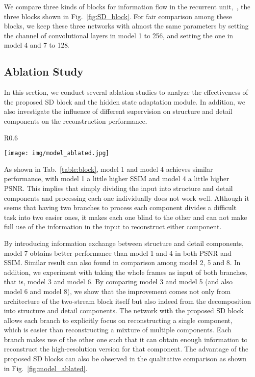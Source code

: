 {}
We compare three kinds of blocks for information flow in the recurrent unit,~\ie, the three blocks shown in Fig.~\ref{fig:SD_block}. 
For fair comparison among these blocks, we keep these three networks with almost the same parameters by setting the channel of convolutional layers in model 1 to 256, and setting the one in model 4 and 7 to 128.
\subsection{Ablation Study}
In this section, we conduct several ablation studies to analyze the effectiveness of the proposed SD block and the hidden state adaptation module. In addition, we also investigate the influence of different supervision on structure and detail components on the reconstruction performance.
\begin{wrapfigure}{R}{0.6\textwidth}
  \vspace{-30pt}
  \begin{center}
    \texttt{[image: img/model\_ablated.jpg]}	
  \end{center}  
  \vspace{-5mm}
 \caption{ Qualitative comparison between different network structures. Zoom in to see better visualization.}
  \label{fig:model_ablated}
  \vspace{-3mm}
\end{wrapfigure}
As shown in Tab.~\ref{table:block}, model 1 and model 4 achieves similar performance, with model 1 a little higher SSIM and model 4 a little higher PSNR. This implies that simply dividing the input into structure and detail components and processing each one individually does not work well. Although it seems that having two branches to process each component divides a difficult task into two easier ones, it makes each one blind to the other and can not make full use of the information in the input to reconstruct either component.

By introducing information exchange between structure and detail components, model 7 obtains better performance than model 1 and 4 in both PSNR and SSIM. Similar result can also found in comparison among model 2, 5 and 8. 
In addition, we experiment with taking the whole frames as input of both branches, that is, model 3 and model 6. By comparing model 3 and model 5 (and also model 6 and model 8), we show that the improvement comes not only from architecture of the two-stream block itself but also indeed from the decomposition into structure and detail components. The network with the proposed SD block allows each branch to explicitly focus on reconstructing a single component, which is easier than reconstructing a mixture of multiple components. Each branch makes use of the other one such that it can obtain enough information to reconstruct the high-resolution version for that component. The advantage of the proposed SD blocks can also be observed in the qualitative comparison as shown in Fig.~\ref{fig:model_ablated}.

